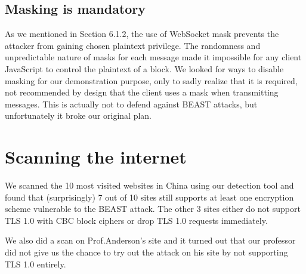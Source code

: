 \documentclass{acm_proc_article-sp}
\begin{document}
\subsection{Masking is mandatory}
As we mentioned in Section 6.1.2, the use of WebSocket mask prevents the attacker from gaining
chosen plaintext privilege. The randomness and unpredictable nature of masks for each message
made it impossible for any client JavaScript to control the plaintext of a block. We looked for ways
to disable masking for our demonstration purpose, only to sadly realize that it is required, not
recommended by design\cite{rfc6455} that the client uses a mask when transmitting messages.
This is actually not to defend against BEAST attacks, but unfortunately it broke our original plan.

\section{Scanning the internet}
We scanned the 10 most visited websites in China using our detection tool and found that
(surprisingly) 7 out of 10 sites still supports at least one encryption scheme vulnerable to the BEAST
attack. The other 3 sites either do not support TLS 1.0 with CBC block ciphers or drop TLS 1.0
requests immediately.

We also did a scan on Prof.Anderson's site and it turned out that our professor did not give us the
chance to try out the attack on his site by not supporting TLS 1.0 entirely.


\balancecolumns
\end{document}

